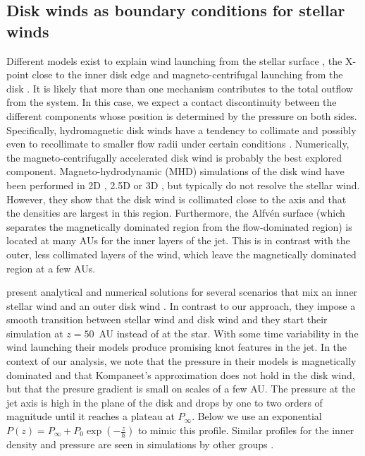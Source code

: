 \documentclass{emulateapj}
\begin{document}
\subsection{Disk winds as boundary conditions for stellar winds}
\label{sect:boundary}
Different models exist to explain wind launching from the stellar surface \citep{1988ApJ...332L..41K,2005ApJ...632L.135M}, the X-point close to the inner disk edge \citep{1994ApJ...429..781S} and magneto-centrifugal launching from the disk \citep{1982MNRAS.199..883B,2005ApJ...630..945A}. It is likely that more than one mechanism contributes to the total outflow from the system. In this case, we expect a contact discontinuity between the different components whose position is determined by the pressure on both sides. Specifically, hydromagnetic disk winds have a tendency to collimate and possibly even to recollimate to smaller flow radii under certain conditions \citep{1982MNRAS.199..883B,1992ApJ...394..117P}.
Numerically, the magneto-centrifugally accelerated disk wind is probably the best explored component. Magneto-hydrodynamic (MHD) simulations of the disk wind have been performed in 2D \citep[e.g.][]{2005ApJ...630..945A}, 2.5D \citep[e.g.][]{2011ApJ...728L..11R} or 3D \citep[e.g.][]{2006ApJ...653L..33A}, but typically do not resolve the stellar wind. However, they show that the disk wind is collimated close to the axis and that the densities are largest in this region. Furthermore, the Alfv\'en surface (which separates the magnetically dominated region from the flow-dominated region) is located at many AUs for the inner layers of the jet. This is in contrast with the outer, less collimated layers of the wind, which leave the magnetically dominated region at a few AUs.

\citet{2009A&A...502..217M} present analytical and numerical solutions for several scenarios that mix an inner stellar wind and an outer disk wind \citep[this model has been extended in ][]{2012A&A...545A..53M,2014A&A...562A.117T}. In contrast to our approach, they impose a smooth transition between stellar wind and disk wind and they start their simulation at $z=50$~AU instead of at the star. With some time variability in the wind launching their models produce promising knot features in the jet. In the context of our analysis, we note that the pressure in their models is magnetically dominated and that Kompaneet's approximation does not hold in the disk wind, but that the presure gradient is small on scales of a few AU. The pressure at the jet axis is high in the plane of the disk and drops by one to two orders of magnitude until it reaches a plateau at $P_\infty$. Below we use an exponential $P(z)=P_\infty+P_0\exp\left(-\frac{z}{h}\right)$ to mimic this profile.
Similar profiles for the inner density and pressure are seen in simulations by other groups \citep[e.g.][]{2005ApJ...630..945A,Li_Krasnopolsky_Blandford_2006,2008ApJ...678.1109M}.
\end{document}
